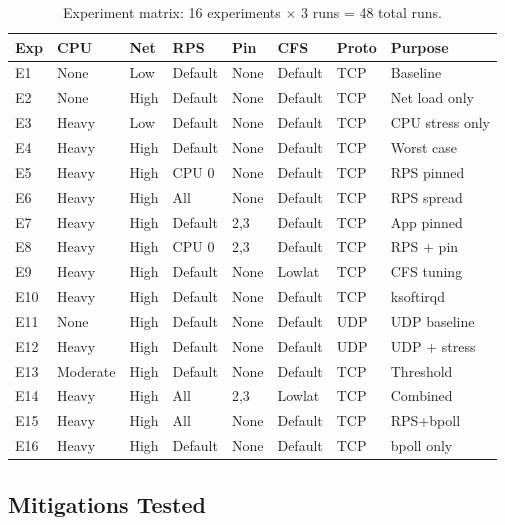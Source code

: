 \documentclass[11pt,a4paper]{article}
\begin{document}
\begin{table}[H]
\centering
\caption{Experiment matrix: 16 experiments $\times$ 3 runs = 48 total runs.}
\label{tab:experiments}
\small
\begin{tabularx}{\textwidth}{l l l l l l l X}
\toprule
\textbf{Exp} & \textbf{CPU} & \textbf{Net} & \textbf{RPS} & \textbf{Pin} & \textbf{CFS} & \textbf{Proto} & \textbf{Purpose} \\
\midrule
E1  & None   & Low  & Default & None & Default & TCP & Baseline \\
E2  & None   & High & Default & None & Default & TCP & Net load only \\
E3  & Heavy  & Low  & Default & None & Default & TCP & CPU stress only \\
E4  & Heavy  & High & Default & None & Default & TCP & Worst case \\
\midrule
E5  & Heavy  & High & CPU 0   & None & Default & TCP & RPS pinned \\
E6  & Heavy  & High & All     & None & Default & TCP & RPS spread \\
E7  & Heavy  & High & Default & 2,3  & Default & TCP & App pinned \\
E8  & Heavy  & High & CPU 0   & 2,3  & Default & TCP & RPS + pin \\
\midrule
E9  & Heavy  & High & Default & None & Lowlat  & TCP & CFS tuning \\
E10 & Heavy  & High & Default & None & Default & TCP & ksoftirqd \\
E11 & None   & High & Default & None & Default & UDP & UDP baseline \\
E12 & Heavy  & High & Default & None & Default & UDP & UDP + stress \\
\midrule
E13 & Moderate & High & Default & None & Default & TCP & Threshold \\
E14 & Heavy  & High & All     & 2,3  & Lowlat  & TCP & Combined \\
E15 & Heavy  & High & All     & None & Default & TCP & RPS+bpoll \\
E16 & Heavy  & High & Default & None & Default & TCP & bpoll only \\
\bottomrule
\end{tabularx}
\end{table}

\subsection{Mitigations Tested}
\end{document}
